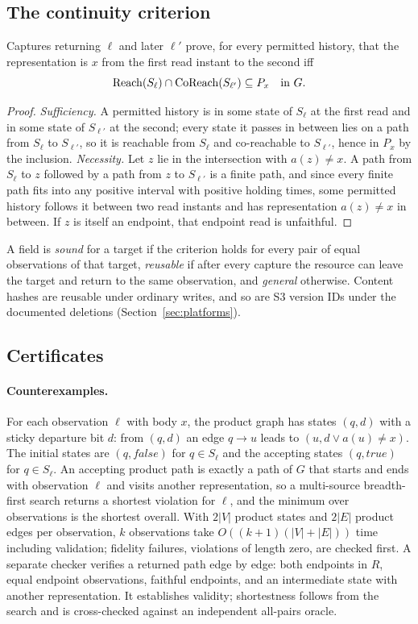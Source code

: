\subsection{The continuity criterion}
\begin{theorem}\label{thm:criterion}
Captures returning $\ell$ and later $\ell'$ prove, for every permitted history,
that the representation is $x$ from the first read instant to the second iff
\[\operatorname{Reach}(S_\ell)\cap\operatorname{CoReach}(S_{\ell'})\subseteq P_x\quad\text{in } G.\]
\end{theorem}
\begin{proof}
\emph{Sufficiency.} A permitted history is in some state of $S_\ell$ at the
first read and in some state of $S_{\ell'}$ at the second; every state it
passes in between lies on a path from $S_\ell$ to $S_{\ell'}$, so it is
reachable from $S_\ell$ and co-reachable to $S_{\ell'}$, hence in $P_x$ by the
inclusion. \emph{Necessity.} Let $z$ lie in the intersection with $a(z)\ne x$.
A path from $S_\ell$ to $z$ followed by a path from $z$ to $S_{\ell'}$ is a
finite path, and since every finite path fits into any positive interval with
positive holding times, some permitted history follows it between two read
instants and has representation $a(z)\ne x$ in between. If $z$ is itself an
endpoint, that endpoint read is unfaithful.
\end{proof}

A field is \emph{sound} for a target if the criterion holds for every pair of
equal observations of that target, \emph{reusable} if after every capture the
resource can leave the target and return to the same observation, and
\emph{general} otherwise. Content hashes are reusable under ordinary writes,
and so are S3 version IDs under the documented deletions
(Section~\ref{sec:platforms}).

\subsection{Certificates}
\paragraph{Counterexamples.} For each observation $\ell$ with body $x$, the
product graph has states $(q,d)$ with a sticky departure bit $d$: from
$(q,d)$ an edge $q\to u$ leads to $(u, d\lor a(u)\ne x)$. The initial states
are $(q,\mathit{false})$ for $q\in S_\ell$ and the accepting states
$(q,\mathit{true})$ for $q\in S_{\ell}$. An accepting product path is exactly
a path of $G$ that starts and ends with observation $\ell$ and visits another
representation, so a multi-source breadth-first search returns a shortest
violation for $\ell$, and the minimum over observations is the shortest
overall. With $2|V|$ product states and $2|E|$ product edges per observation,
$k$ observations take $O((k+1)(|V|+|E|))$ time including validation;
fidelity failures, violations of length zero, are checked first. A separate
checker verifies a returned path edge by edge: both endpoints in $R$, equal
endpoint observations, faithful endpoints, and an intermediate state with
another representation. It establishes validity; shortestness follows from
the search and is cross-checked against an independent all-pairs oracle.

